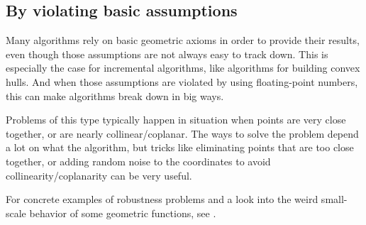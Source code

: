 \subsection{By violating basic assumptions}
Many algorithms rely on basic geometric axioms in order to provide their results, even though those assumptions are not always easy to track down. This is especially the case for incremental algorithms, like algorithms for building convex hulls. And when those assumptions are violated by using floating-point numbers, this can make algorithms break down in big ways.

Problems of this type typically happen in situation when points are very close together, or are nearly collinear/coplanar. The ways to solve the problem depend a lot on what the algorithm, but tricks like eliminating points that are too close together, or adding random noise to the coordinates to avoid collinearity/coplanarity can be very useful.

For concrete examples of robustness problems and a look into the weird small-scale behavior of some geometric functions, see \cite{classroom-robustness}.
